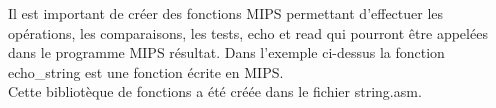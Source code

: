 Il est important de créer des fonctions MIPS permettant d'effectuer les opérations, les comparaisons, les tests, echo et read qui pourront être appelées dans le programme MIPS résultat. Dans l'exemple ci-dessus la fonction \textsf{echo\_string} est une fonction écrite en MIPS.\\
Cette bibliotèque de fonctions a été créée dans le fichier \textsf{string.asm}.